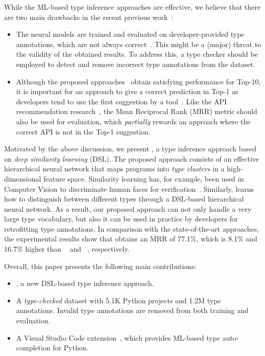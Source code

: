 While the ML-based type inference approaches are effective, we believe that there are two main drawbacks in the recent previous work~\cite{pradel2019typewriter, allamanis2020typilus}:
\begin{itemize}
	\item The neural models are trained and evaluated on developer-provided type annotations, which are not always correct~\cite{ore2018assessing, rak2020python}. This might be a (major) threat to the validity of the obtained results. To address this, a type checker should be employed to detect and remove incorrect type annotations from the dataset.
	\item Although the proposed approaches~\cite{pradel2019typewriter, allamanis2020typilus} obtain satisfying performance for Top-10, it is important for an approach to give a correct prediction in Top-1 as developers tend to use the first suggestion by a tool~\cite{parnin2011automated}. Like the API recommendation research~\cite{liu2018effective, he2021pyart}, the Mean Reciprocal Rank (MRR) metric should also be used for evaluation, which \emph{partially} rewards an approach where the correct API is not in the Top-1 suggestion.
\end{itemize}

Motivated by the above discussion, we present \name, a type inference approach based on \emph{deep similarity learning} (DSL).
The proposed approach consists of an effective hierarchical neural network that maps programs into \emph{type clusters} in a high-dimensional feature space.
Similarity learning has, for example, been used in Computer Vision to discriminate human faces for verification~\cite{chopra2005learning}. Similarly, \name learns how to distinguish between different types through a DSL-based hierarchical neural network.
As a result, our proposed approach can not only handle a very large type vocabulary, but also it can be used in practice by developers for retrofitting type annotations.
In comparison with the state-of-the-art approaches, the experimental results show that \name obtains an MRR of 77.1\%,
which is 8.1\% and 16.7\% higher than ~\cite{allamanis2020typilus} and ~\cite{pradel2019typewriter}, respectively.

\smallskip
\noindent
Overall, this paper presents the following main contributions:
\begin{itemize}
	\item \name, a new DSL-based type inference approach.
	\item A \emph{type-checked} dataset with 5.1K Python projects and 1.2M type annotations. Invalid type annotations are removed from both training and evaluation.
	\item A Visual Studio Code extension~\cite{vscodet4py}, which provides ML-based type auto-completion for Python.
\end{itemize}

